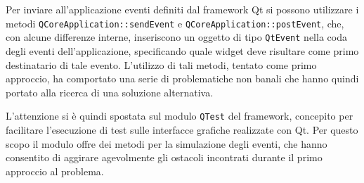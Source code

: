 \documentclass[12pt]{toptesi}
\begin{document}
Per inviare all'applicazione eventi definiti dal framework Qt si possono utilizzare i metodi \verb|QCoreApplication::sendEvent| e \verb|QCoreApplication::postEvent|, che, con alcune differenze interne, inseriscono un oggetto di tipo \verb|QtEvent| nella coda degli eventi dell'applicazione, specificando quale widget deve risultare come primo destinatario di tale evento. L'utilizzo di tali metodi, tentato come primo approccio, ha comportato una serie di problematiche non banali che hanno quindi portato alla ricerca di una soluzione alternativa.

L'attenzione si è quindi spostata sul modulo \verb|QTest| del framework, concepito per facilitare l'esecuzione di test sulle interfacce grafiche realizzate con Qt. Per questo scopo il modulo offre dei metodi per la simulazione degli eventi, che hanno consentito di aggirare agevolmente gli ostacoli incontrati durante il primo approccio al problema.
\end{document}
